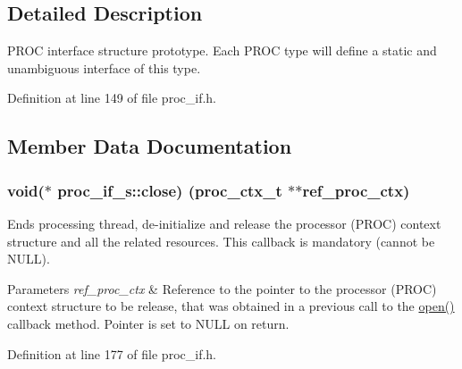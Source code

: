 \subsection{Detailed Description}
P\+R\+OC interface structure prototype. Each P\+R\+OC type will define a static and unambiguous interface of this type. 

Definition at line 149 of file proc\+\_\+if.\+h.



\subsection{Member Data Documentation}
\subsubsection[{\texorpdfstring{close}{close}}]{\setlength{\rightskip}{0pt plus 5cm}void($\ast$ proc\+\_\+if\+\_\+s\+::close) ({\bf proc\+\_\+ctx\+\_\+t} $\ast$$\ast$ref\+\_\+proc\+\_\+ctx)}\hypertarget{structproc__if__s_af5971ac1d09d1c6ec3508c36fb286c19}{}\label{structproc__if__s_af5971ac1d09d1c6ec3508c36fb286c19}
Ends processing thread, de-\/initialize and release the processor (P\+R\+OC) context structure and all the related resources. This callback is mandatory (cannot be N\+U\+LL). 
\begin{DoxyParams}{Parameters}
{\em ref\+\_\+proc\+\_\+ctx} & Reference to the pointer to the processor (P\+R\+OC) context structure to be release, that was obtained in a previous call to the \textquotesingle{}\hyperlink{structproc__if__s_a34999576771394dfb721463c8455ba06}{open()}\textquotesingle{} callback method. Pointer is set to N\+U\+LL on return. \\
\hline
\end{DoxyParams}


Definition at line 177 of file proc\+\_\+if.\+h.

